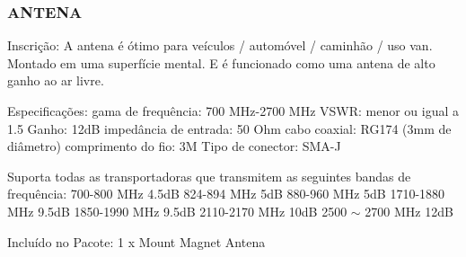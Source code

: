 \documentclass[
  12pt,				%
  openright,			%
  twoside,			%
  a4paper,			%
  english,			%
  french,				%
  spanish,			%
  brazil,				%
  ]{abntex2}
\begin{document}
\subsubsection*{ANTENA}


Inscrição:
A antena é ótimo para veículos / automóvel / caminhão / uso van. Montado em uma superfície mental. E é funcionado como uma antena de alto ganho ao ar livre.

Especificações:
gama de frequência: 700 MHz-2700 MHz
VSWR: menor ou igual a 1.5
Ganho: 12dB
impedância de entrada: 50 Ohm
cabo coaxial: RG174 (3mm de diâmetro)
comprimento do fio: 3M
Tipo de conector: SMA-J

Suporta todas as transportadoras que transmitem as seguintes bandas de frequência:
700-800 MHz 4.5dB
824-894 MHz 5dB
880-960 MHz 5dB
1710-1880 MHz 9.5dB
1850-1990 MHz 9.5dB
2110-2170 MHz 10dB
2500 $\sim$ 2700 MHz 12dB

Incluído no Pacote:
1 x Mount Magnet Antena
\end{document}
